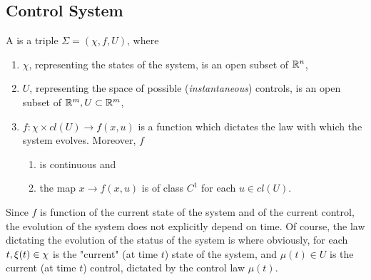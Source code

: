 \subsection{Control System} A  is a triple $\Sigma=(\chi,f,U) $, where 
\begin{enumerate}
	\item $\chi$, representing the states of the system, is an open subset of $\mathbb{R}^n$,
	\item $U$, representing the space of possible (\textit{instantaneous}) controls, is an open subset of $\mathbb{R}^m,U\subset\mathbb{R}^m$,
	\item $f: \chi \times cl(U) \rightarrow f(x,u)$ is a function which dictates the law with which the system evolves. Moreover, $f$
	\begin{enumerate}
		\item is continuous and
		\item the map $x \rightarrow f(x,u)$ is of class $C^1$ for each $u \in cl(U)$.
	\end{enumerate}
\end{enumerate}

Since $f$ is function of the current state of the system and of the current control, the evolution of the system does not explicitly depend on time. Of course, the law dictating the evolution of the status of the system is 
where obviously, for each $t,\xi (t)\in\chi$ is the "current" (at time $t$) state of the system, and $\mu(t)\in U$ is the current (at time $t$) control, dictated by the control law $\mu(t)$.


